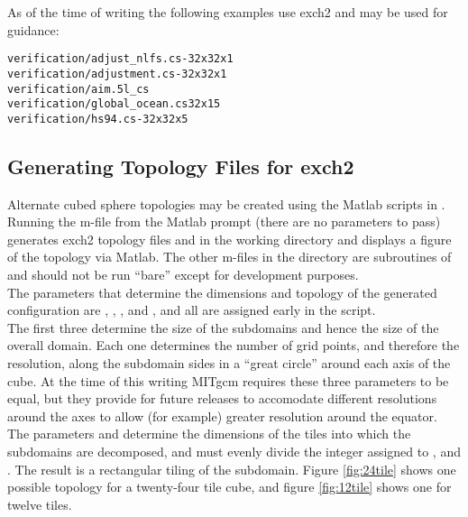 As of the time of writing the following examples use exch2 and may be
used for guidance:

\begin{verbatim}
verification/adjust_nlfs.cs-32x32x1
verification/adjustment.cs-32x32x1 
verification/aim.5l_cs
verification/global_ocean.cs32x15
verification/hs94.cs-32x32x5
\end{verbatim}




\subsection{Generating Topology Files for exch2}
\label{sec:topogen}

Alternate cubed sphere topologies may be created using the Matlab
scripts in . Running the
m-file
from the Matlab prompt (there are no parameters to pass) generates
exch2 topology files  and
 in the working directory and displays a figure of
the topology via Matlab.  The other m-files in the directory are
subroutines of  and should not be run ``bare'' except
for development purposes. \\

The parameters that determine the dimensions and topology of the
generated configuration are , , ,
 and , and all are assigned early in the script. \\

The first three determine the size of the subdomains and
hence the size of the overall domain.  Each one determines the number
of grid points, and therefore the resolution, along the subdomain
sides in a ``great circle'' around each axis of the cube.  At the time
of this writing MITgcm requires these three parameters to be equal,
but they provide for future releases  to accomodate different
resolutions around the axes to allow (for example) greater resolution
around the equator.\\

The parameters  and  determine the dimensions of
the tiles into which the subdomains are decomposed, and must evenly
divide the integer assigned to ,  and .
The result is a rectangular tiling of the subdomain.  Figure
\ref{fig:24tile} shows one possible topology for a twenty-four tile
cube, and figure \ref{fig:12tile} shows one for twelve tiles. \\

